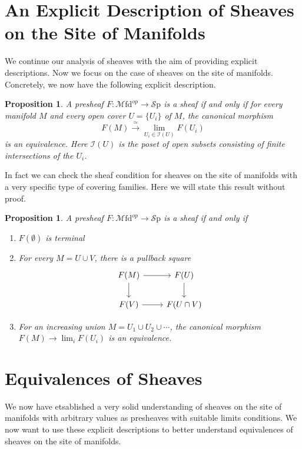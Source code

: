 \documentclass[10pt]{amsart}
\newcommand{\I}{\mathscr{I}}
\newcommand{\Sp}{\mathscr{S}\mathrm{p}}
\newcommand{\Mfd}{\mathscr{M}\mathrm{fd}}
\newtheorem{proposition}[equation]{Proposition}
\theoremstyle{definition}
\theoremstyle{remark}
\begin{document}
\section{An Explicit Description of Sheaves on the Site of Manifolds}
We continue our analysis of sheaves with the aim of providing explicit descriptions. Now we focus on the case of sheaves on the site of manifolds. Concretely, we now have the following explicit description.

\begin{proposition}
  A presheaf $F\colon \Mfd^{op} \to \Sp$ is a sheaf if and only if for every manifold $M$ and every open cover $U = \{U_i\}$ of $M$, the canonical morphism
  \[F(M) \xrightarrow{ \ \simeq \ } \lim_{U_i \in \I(U)}F(U_i) \]
  is an equivalence. Here $\I(U)$ is the poset of open subsets consisting of finite intersections of the $U_i$.
\end{proposition}

In fact we can check the sheaf condition for sheaves on the site of manifolds with a very specific type of covering families. Here we will state this result without proof.

\begin{proposition}
  A presheaf $F\colon \Mfd^{op} \to \Sp$ is a sheaf if and only if
  \begin{enumerate}
    \item $F(\emptyset)$ is terminal
    \item For every $M = U \cup V$, there is a pullback square 
    \[
      \begin{tikzcd}
        F(M) \ar[r] \ar[d] & F(U) \ar[d] \\
        F(V) \ar[r] & F(U \cap V)
      \end{tikzcd}
    \]
    \item For an increasing union $M = U_1 \cup U_2 \cup \cdots$, the canonical morphism $F(M) \to \lim_{i} F(U_i)$ is an equivalence.
  \end{enumerate}
\end{proposition}

\section{Equivalences of Sheaves}
We now have etsablished a very solid understanding of sheaves on the site of manifolds with arbitrary values as presheaves with suitable limits conditions. We now want to use these explicit descriptions to better understand equivalences of sheaves on the site of manifolds.
\end{document}
